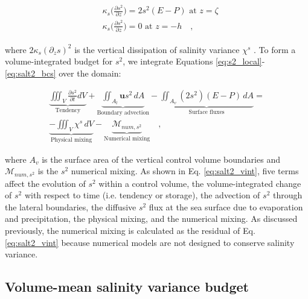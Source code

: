 \documentclass[draft]{agujournal2019}
\begin{document}
\begin{linenomath*}
\begin{align} 
    \begin{split}
        & \kappa_s \bigg({\frac{\partial s^2}{\partial z}} \bigg) = 2s^2(E-P) \,\, \textrm{at} \,\, z = \zeta \\
        & \kappa_s \bigg({\frac{\partial s^2}{\partial z}} \bigg) = 0 \,\, \textrm{at} \,\, z = -h \label{eq:salt2_bcs} \quad ,
    \end{split}
\end{align}
\end{linenomath*}
where $2 \kappa_s (\partial_zs)^2$ is the vertical dissipation of salinity variance $\chi^s$ \cite{Burchard_2008}. To form a volume-integrated budget for $s^2$, we integrate Equations \ref{eq:s2_local}-\ref{eq:salt2_bcs} over the domain:
\begin{linenomath*}
\begin{equation} \label{eq:salt2_vint}
    \begin{split}
        \underbrace{ \iiint_V \frac{\partial s^2}{\partial t}  dV}_{\text{Tendency}} + \underbrace{\iint_{A_l} \textbf{u}s^2 \,  dA}_{\text{Boundary advection}}  - \underbrace{\iint_{A_{v}}(2s^2)(E-P) \, dA}_{\text{Surface fluxes}} = \\
        \underbrace{-\iiint_V \chi^s \, dV}_{\text{Physical mixing}}-\underbrace{\mathcal{M}_{num, s^2}}_{\text{Numerical mixing}} \quad ,
   \end{split}
\end{equation}
\end{linenomath*}
where $A_v$ is the surface area of the vertical control volume boundaries and $\mathcal{M}_{num, s^2}$ is the $s^2$ numerical mixing. As shown in Eq. \ref{eq:salt2_vint}, five terms affect the evolution of $s^2$ within a control volume, the volume-integrated change of $s^2$ with respect to time (i.e. tendency or storage), the advection of $s^2$ through the lateral boundaries, the diffusive $s^2$ flux at the sea surface due to evaporation and precipitation, the physical mixing, and the numerical mixing. As discussed previously, the numerical mixing is calculated as the residual of Eq. \ref{eq:salt2_vint} because numerical models are not designed to conserve salinity variance.

\subsection{Volume-mean salinity variance budget}
\end{document}
